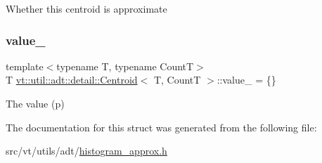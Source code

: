 Whether this centroid is approximate \mbox{\label{structvt_1_1util_1_1adt_1_1detail_1_1_centroid_a17b351e747aba8aa88699a4d9137a692}} 
\subsubsection{\texorpdfstring{value\+\_\+}{value\_}}
{\footnotesize\ttfamily template$<$typename T, typename CountT$>$ \\
T \hyperlink{structvt_1_1util_1_1adt_1_1detail_1_1_centroid}{vt\+::util\+::adt\+::detail\+::\+Centroid}$<$ T, CountT $>$\+::value\+\_\+ = \{\}\hspace{0.3cm}{\ttfamily [private]}}

The value (p) 

The documentation for this struct was generated from the following file\+:\begin{DoxyCompactItemize}
\item 
src/vt/utils/adt/\hyperlink{histogram__approx_8h}{histogram\+\_\+approx.\+h}\end{DoxyCompactItemize}
